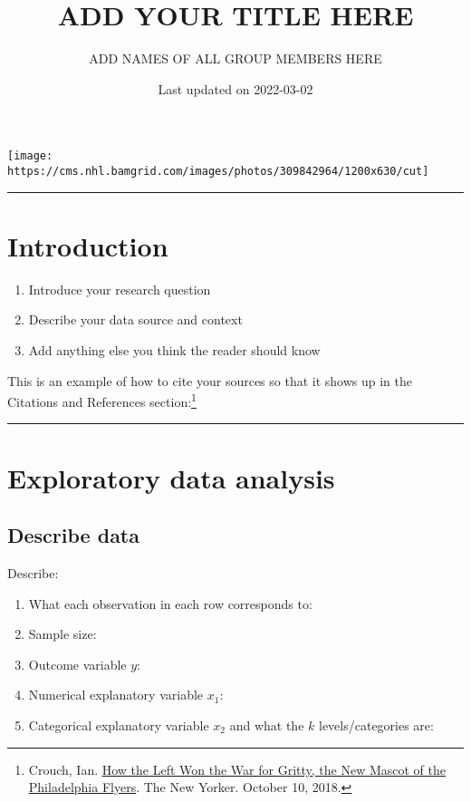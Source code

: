 \documentclass[
]{article}
\title{ADD YOUR TITLE HERE}
\author{ADD NAMES OF ALL GROUP MEMBERS HERE}
\date{Last updated on 2022-03-02}
\providecommand{\tightlist}{%
  \setlength{\itemsep}{0pt}\setlength{\parskip}{0pt}}
\begin{document}
\maketitle

{
\setcounter{tocdepth}{2}
\tableofcontents
}
\texttt{[image: https://cms.nhl.bamgrid.com/images/photos/309842964/1200x630/cut]}

\begin{center}\rule{0.5\linewidth}{0.5pt}\end{center}

\hypertarget{introduction}{%
\section{Introduction}\label{introduction}}

\begin{enumerate}
\def\labelenumi{\arabic{enumi}.}
\tightlist
\item
  Introduce your research question
\item
  Describe your data source and context
\item
  Add anything else you think the reader should know
\end{enumerate}

This is an example of how to cite your sources so that it shows up in
the Citations and References section:\footnote{Crouch, Ian.
  \href{https://www.newyorker.com/culture/culture-desk/how-the-left-won-the-war-for-gritty}{How
  the Left Won the War for Gritty, the New Mascot of the Philadelphia
  Flyers}. The New Yorker. October 10, 2018.}

\begin{center}\rule{0.5\linewidth}{0.5pt}\end{center}

\hypertarget{exploratory-data-analysis}{%
\section{Exploratory data analysis}\label{exploratory-data-analysis}}

\hypertarget{describe-data}{%
\subsection{Describe data}\label{describe-data}}

Describe:

\begin{enumerate}
\def\labelenumi{\arabic{enumi}.}
\tightlist
\item
  What each observation in each row corresponds to:
\item
  Sample size:
\item
  Outcome variable \(y\):
\item
  Numerical explanatory variable \(x_1\):
\item
  Categorical explanatory variable \(x_2\) and what the \(k\)
  levels/categories are:
\end{enumerate}
\end{document}
